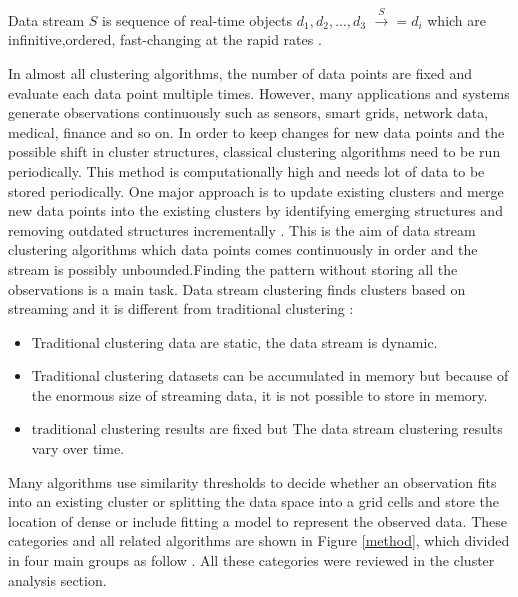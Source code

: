\documentclass[../UNBThesis2.tex]{subfiles}
\begin{document}
Data stream $S$ is sequence of real-time objects $d_1, d_2, ..., d_3 $ $\xrightarrow S = {d_i}$ which are infinitive,ordered, fast-changing at the rapid rates \cite{han2011data}.


In almost all clustering algorithms, the number of data points are fixed and evaluate each data point multiple times. However, many applications and systems generate observations continuously such as sensors, smart grids, network data, medical, finance and so on. In order to keep changes for new data points and the possible shift in cluster structures, classical clustering algorithms need to be run periodically. This method is computationally high and needs lot of data to be stored periodically. One major approach is to update existing clusters and merge new data points into the existing clusters by identifying emerging structures and removing outdated structures incrementally \cite{carnein2019optimizing}. This is the aim of data stream clustering algorithms which data points comes continuously in order and the stream is possibly unbounded.Finding the pattern without storing all the observations is a main task.
Data stream clustering finds clusters based on streaming and it is different from traditional clustering \cite{toshniwal2013clustering}:
\begin{itemize}
    \item Traditional clustering data are static, the data stream is dynamic.
    \item Traditional clustering datasets can be accumulated in memory but because of the enormous size of streaming data, it is not possible to store in memory.
    \item traditional clustering results are fixed but The data stream clustering results vary over time.
\end{itemize}



Many algorithms use similarity thresholds to decide whether an observation fits into an existing cluster or splitting the data space into a grid cells and store the location of dense or include fitting a model to represent the observed data. These categories and all related algorithms are shown in Figure \ref{method}, which divided in four main groups as follow \cite{zubaroglu2020data, ghesmoune2016state}. All these categories were reviewed in the cluster analysis section. 
\end{document}
